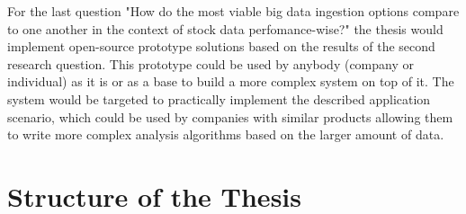 For the last question "How do the most viable big data ingestion options compare to one another in the context of stock data perfomance-wise?" the thesis would implement open-source prototype solutions based on the results of the second research question.
This prototype could be used by anybody (company or individual) as it is or as a base to build a more complex system on top of it.
The system would be targeted to practically implement the described application scenario, which could be used by companies with similar products allowing them to write more complex analysis algorithms based on the larger amount of data.

\section{Structure of the Thesis}

